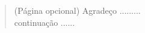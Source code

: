 


\begin{quote}
\noindent  (Página opcional) Agradeço .........\\ 
\noindent  continuação ......
 
\end{quote}

\clearpage

\pagebreak


